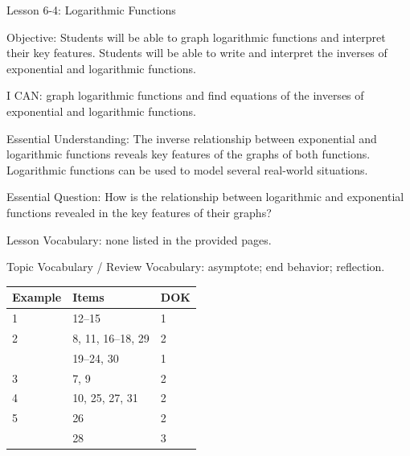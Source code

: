 \documentclass{article}
\newenvironment{lesson-meta}{}{}        %
\newenvironment{item-analysis}{}{}      %
\newcommand{\uncertain}[2]{#1}          %
\begin{document}
\begin{lesson-meta}
Lesson 6-4: Logarithmic Functions

Objective: Students will be able to graph logarithmic functions and interpret their key features. Students will be able to write and interpret the inverses of exponential and logarithmic functions.

I CAN: graph logarithmic functions and find equations of the inverses of exponential and logarithmic functions.

Essential Understanding: The inverse relationship between exponential and logarithmic functions reveals key features of the graphs of both functions. Logarithmic functions can be used to model several real-world situations.

Essential Question: How is the relationship between logarithmic and exponential functions revealed in the key features of their graphs?

Lesson Vocabulary: \uncertain{none listed in the provided pages}{unclear}.

Topic Vocabulary / Review Vocabulary: asymptote; end behavior; reflection.
\end{lesson-meta}

\begin{item-analysis}
\begin{tabular}{lll}
\toprule
Example & Items & DOK \\
\midrule
1 & 12--15 & 1 \\
2 & 8, 11, 16--18, 29 & 2 \\
  & 19--24, 30 & 1 \\
3 & 7, 9 & 2 \\
4 & 10, 25, 27, 31 & 2 \\
5 & 26 & 2 \\
  & 28 & 3 \\
\bottomrule
\end{tabular}
\end{item-analysis}
\end{document}
